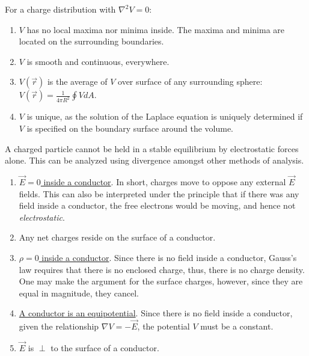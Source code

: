 \documentclass{article}
\newcommand{\formbox}[2]{\begin{center} \begin{tcolorbox}[title = #1, boxrule=2pt,arc=3.4pt,boxsep=0mm] #2\end{tcolorbox}\end{center}}
\begin{document}
\begin{multicols*}{3}
    \formbox{Uniqueness of Solutions}{
        For a charge distribution with $\nabla^2V = 0$:
        \begin{enumerate}
            \item $V$ has no local maxima nor minima inside. The maxima and minima are located
            on the surrounding boundaries.
            \item $V$ is smooth and continuous, everywhere.
            \item $V(\vec{r})$ is the average of $V$ over surface of any surrounding sphere:
            $V(\vec{r}) = \frac{1}{4\pi R^2}\oint VdA$.
            \item $V$ is unique, as the solution of the Laplace equation is uniquely determined
            if $V$ is specified on the boundary surface around the volume.
        \end{enumerate}
    }
    
    \formbox{Earnshaw's Theorem}{
    A charged particle cannot be held in a stable equilibrium by electrostatic forces alone.
    This can be analyzed using divergence amongst other methods of analysis.
    }
    
    \formbox{Properties of Conductors}{
        \begin{enumerate}
            \item \underline{$\vec{E} = 0$ inside a conductor}. In short, charges move to oppose any external $\vec{E}$ fields.
            This can also be interpreted under the principle that if there was any field inside
            a conductor, the free electrons would be moving, and hence not \textit{electrostatic}.
            \item Any net charges reside on the surface of a conductor.
            \item \underline{$\rho = 0$ inside a conductor}. Since there is no field inside a conductor,
            Gauss's law requires that there is no enclosed charge, thus, there is no charge density.
            One may make the argument for the surface charges, however, since they are equal in magnitude,
            they cancel.
            \item \underline{A conductor is an equipotential}. Since there is no field inside
            a conductor, given the relationship $\nabla V = -\vec{E}$, the potential $V$ must
            be a constant.
            \item $\vec{E}$ is $\perp$ to the surface of a conductor.
        \end{enumerate} 
    }
    

\end{multicols*}
\end{document}
